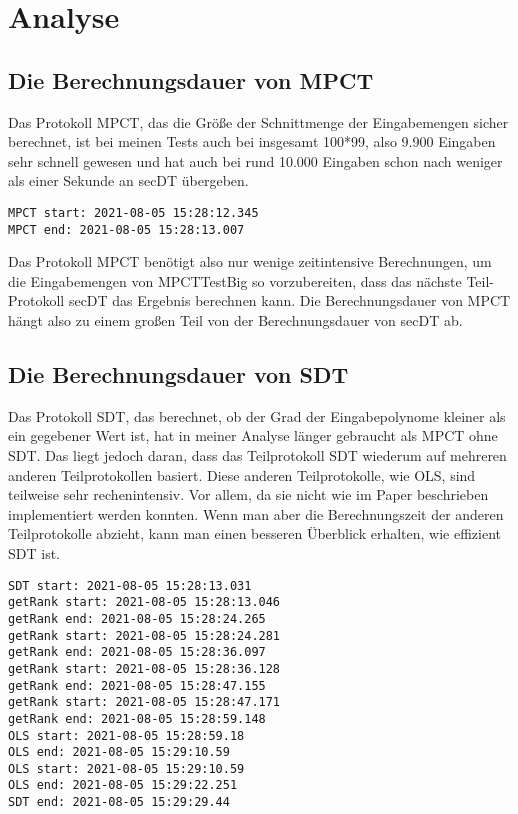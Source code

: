 \chapter{Analyse}


\section{Die Berechnungsdauer von MPCT}
Das Protokoll MPCT, das die Größe der Schnittmenge der Eingabemengen sicher berechnet, ist bei meinen Tests auch bei insgesamt 100*99, also 9.900 Eingaben sehr schnell gewesen und hat auch bei rund 10.000 Eingaben schon nach weniger als einer Sekunde an secDT übergeben.\\
\begin{lstlisting}[caption = Ausschnitt von Rückgabe von Test MPCTTestBig. Dauer von MPCT ohne SDT]
MPCT start: 2021-08-05 15:28:12.345
MPCT end: 2021-08-05 15:28:13.007
\end{lstlisting}
Das Protokoll MPCT benötigt also nur wenige zeitintensive Berechnungen, um die Eingabemengen von MPCTTestBig so vorzubereiten, dass das nächste Teil-Protokoll secDT das Ergebnis berechnen kann. Die Berechnungsdauer von MPCT hängt also zu einem großen Teil von der Berechnungsdauer von secDT ab.

\section{Die Berechnungsdauer von SDT}
Das Protokoll SDT, das berechnet, ob der Grad der Eingabepolynome kleiner als ein gegebener Wert ist, hat in meiner Analyse länger gebraucht als MPCT ohne SDT. Das liegt jedoch daran, dass das Teilprotokoll SDT wiederum auf mehreren anderen Teilprotokollen basiert. Diese anderen Teilprotokolle, wie OLS, sind teilweise sehr rechenintensiv. Vor allem, da sie nicht wie im Paper beschrieben implementiert werden konnten. Wenn man aber die Berechnungszeit der anderen Teilprotokolle abzieht, kann man einen besseren Überblick erhalten, wie effizient SDT ist.

\begin{lstlisting}[caption = Ausschnitt von Rückgabe von Test MPCTTestBig. Dauer von SDT]
SDT start: 2021-08-05 15:28:13.031
getRank start: 2021-08-05 15:28:13.046
getRank end: 2021-08-05 15:28:24.265
getRank start: 2021-08-05 15:28:24.281
getRank end: 2021-08-05 15:28:36.097
getRank start: 2021-08-05 15:28:36.128
getRank end: 2021-08-05 15:28:47.155
getRank start: 2021-08-05 15:28:47.171
getRank end: 2021-08-05 15:28:59.148
OLS start: 2021-08-05 15:28:59.18
OLS end: 2021-08-05 15:29:10.59
OLS start: 2021-08-05 15:29:10.59
OLS end: 2021-08-05 15:29:22.251
SDT end: 2021-08-05 15:29:29.44

\end{lstlisting}

